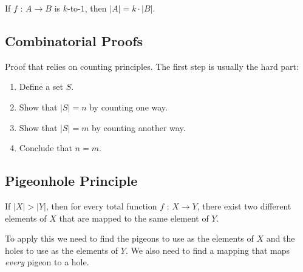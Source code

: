 \documentclass[../main.tex]{subfiles}
\begin{document}
If $f$ : $A \to B$ is $k$-to-$1$, then $\lvert A \rvert = k \cdot \lvert B \rvert$.

\subsection{Combinatorial Proofs}

Proof that relies on counting principles. The first step is usually the hard part:

\begin{enumerate}
  \item Define a set $S$.
  \item Show that $\lvert S \rvert = n$ by counting one way.
  \item Show that $\lvert S \rvert = m$ by counting another way.
  \item Conclude that $n = m$.
\end{enumerate}

\subsection{Pigeonhole Principle}

If $\lvert X \rvert > \lvert Y \rvert$, then for every total function $f$ : $X \to Y$, there exist two different elements of $X$ that are mapped to the same element of $Y$.

To apply this we need to find the pigeons to use as the elements of $X$ and the holes to use as the elements of $Y$. We also need to find a mapping that maps \textit{every} pigeon to a hole.
\end{document}

